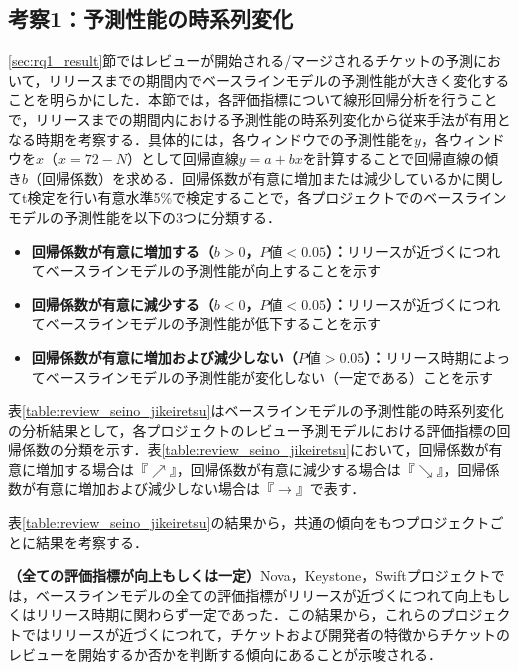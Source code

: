 \documentclass[submit]{ipsj}
\begin{document}
\subsection{考察1：予測性能の時系列変化}\label{sec:rq1_kousatu1}
\ref{sec:rq1_result}節ではレビューが開始される/マージされるチケットの予測において，リリースまでの期間内でベースラインモデルの予測性能が大きく変化することを明らかにした．本節では，各評価指標について線形回帰分析を行うことで，リリースまでの期間内における予測性能の時系列変化から従来手法が有用となる時期を考察する．具体的には，各ウィンドウでの予測性能を$y$，各ウィンドウを$x$（$x=72-N$）として回帰直線$y=a+bx$を計算することで回帰直線の傾き$b$（回帰係数）を求める．回帰係数が有意に増加または減少しているかに関してt検定を行い有意水準5\%で検定することで，各プロジェクトでのベースラインモデルの予測性能を以下の3つに分類する．

\begin{itemize}
  \item \textbf{回帰係数が有意に増加する（$b>0$，$P\text{値}<0.05$）：}リリースが近づくにつれてベースラインモデルの予測性能が向上することを示す
  \item \textbf{回帰係数が有意に減少する（$b<0$，$P\text{値}<0.05$）：}リリースが近づくにつれてベースラインモデルの予測性能が低下することを示す
  \item \textbf{回帰係数が有意に増加および減少しない（$P\text{値}>0.05$）：}リリース時期によってベースラインモデルの予測性能が変化しない（一定である）ことを示す
\end{itemize}

表\ref{table:review_seino_jikeiretsu}はベースラインモデルの予測性能の時系列変化の分析結果として，各プロジェクトのレビュー予測モデルにおける評価指標の回帰係数の分類を示す．表\ref{table:review_seino_jikeiretsu}において，回帰係数が有意に増加する場合は『$\nearrow$』，回帰係数が有意に減少する場合は『$\searrow$』，回帰係数が有意に増加および減少しない場合は『$\rightarrow$』で表す．

表\ref{table:review_seino_jikeiretsu}の結果から，共通の傾向をもつプロジェクトごとに結果を考察する．

\textbf{（全ての評価指標が向上もしくは一定）}Nova，Keystone，Swiftプロジェクトでは，ベースラインモデルの全ての評価指標がリリースが近づくにつれて向上もしくはリリース時期に関わらず一定であった．この結果から，これらのプロジェクトではリリースが近づくにつれて，チケットおよび開発者の特徴からチケットのレビューを開始するか否かを判断する傾向にあることが示唆される．
\end{document}
